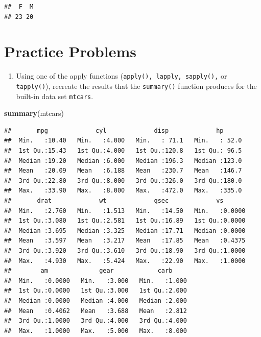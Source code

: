 \documentclass[
]{book}
\newenvironment{Shaded}{\begin{snugshade}}{\end{snugshade}}
\newcommand{\KeywordTok}[1]{\textcolor[rgb]{0.13,0.29,0.53}{\textbf{#1}}}
\newcommand{\NormalTok}[1]{#1}
\providecommand{\tightlist}{%
  \setlength{\itemsep}{0pt}\setlength{\parskip}{0pt}}
\begin{document}
\begin{verbatim}
##  F  M 
## 23 20
\end{verbatim}

\hypertarget{practice-problems-1}{%
\section*{Practice Problems}\label{practice-problems-1}}

\begin{enumerate}
\def\labelenumi{\arabic{enumi})}
\tightlist
\item
  Using one of the apply functions (\texttt{apply(),\ lapply,\ sapply(),} or \texttt{tapply()}), recreate the results that the \texttt{summary()} function produces for the built-in data set \texttt{mtcars}.
\end{enumerate}

\begin{Shaded}
\begin{Highlighting}[]
\KeywordTok{summary}\NormalTok{(mtcars)}
\end{Highlighting}
\end{Shaded}

\begin{verbatim}
##       mpg             cyl             disp             hp       
##  Min.   :10.40   Min.   :4.000   Min.   : 71.1   Min.   : 52.0  
##  1st Qu.:15.43   1st Qu.:4.000   1st Qu.:120.8   1st Qu.: 96.5  
##  Median :19.20   Median :6.000   Median :196.3   Median :123.0  
##  Mean   :20.09   Mean   :6.188   Mean   :230.7   Mean   :146.7  
##  3rd Qu.:22.80   3rd Qu.:8.000   3rd Qu.:326.0   3rd Qu.:180.0  
##  Max.   :33.90   Max.   :8.000   Max.   :472.0   Max.   :335.0  
##       drat             wt             qsec             vs        
##  Min.   :2.760   Min.   :1.513   Min.   :14.50   Min.   :0.0000  
##  1st Qu.:3.080   1st Qu.:2.581   1st Qu.:16.89   1st Qu.:0.0000  
##  Median :3.695   Median :3.325   Median :17.71   Median :0.0000  
##  Mean   :3.597   Mean   :3.217   Mean   :17.85   Mean   :0.4375  
##  3rd Qu.:3.920   3rd Qu.:3.610   3rd Qu.:18.90   3rd Qu.:1.0000  
##  Max.   :4.930   Max.   :5.424   Max.   :22.90   Max.   :1.0000  
##        am              gear            carb      
##  Min.   :0.0000   Min.   :3.000   Min.   :1.000  
##  1st Qu.:0.0000   1st Qu.:3.000   1st Qu.:2.000  
##  Median :0.0000   Median :4.000   Median :2.000  
##  Mean   :0.4062   Mean   :3.688   Mean   :2.812  
##  3rd Qu.:1.0000   3rd Qu.:4.000   3rd Qu.:4.000  
##  Max.   :1.0000   Max.   :5.000   Max.   :8.000
\end{verbatim}
\end{document}
